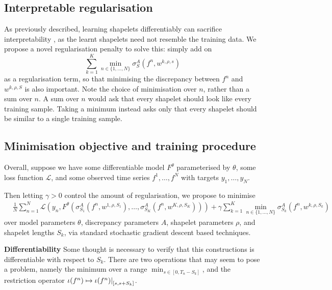 \documentclass{article}
\theoremstyle{plain}
\theoremstyle{definition}
\newcommand{\restr}[2]{{\left.\kern-\nulldelimiterspace #1 \right|_{#2}}}
\newcommand{\boldheading}[1]{

\textbf{#1}\quad}
\begin{document}
	\subsection{Interpretable regularisation}
	As previously described, learning shapelets differentiably can sacrifice interpretability \cite{wang2019interp}, as the learnt shapelets need not resemble the training data. We propose a novel regularisation penalty to solve this: simply add on
	\begin{equation}
		\label{eq:interpretable_reg}
		\sum_{k = 1}^K \min_{n \in \{1, \ldots, N\}} \sigma^A_S(f^n, w^{k, \rho, s})
	\end{equation}
	as a regularisation term, so that minimising the discrepancy between $f^n$ and $w^{k, \rho, S}$ is also important. Note the choice of minimisation over $n$, rather than a sum over $n$. A sum over $n$ would ask that every shapelet should look like every training sample. Taking a minimum instead asks only that every shapelet should be similar to a single training sample.
	
	\subsection{Minimisation objective and training procedure}
	Overall, suppose we have some differentiable model $F^\theta$ parameterised by $\theta$, some loss function $\mathcal{L}$, and some observed time series $f^1, \ldots, f^N$ with targets $y_1, \ldots, y_N$.	
	
	Then letting $\gamma > 0$ control the amount of regularisation, we propose to minimise
	\newcommand{\objective}{&\frac{1}{N}\sum_{n = 1}^N \mathcal{L}(y_n, F^\theta(\sigma^A_{S_1}(f^n, w^{1, \rho, S_1}), \ldots, \sigma^A_{S_K}(f^n, w^{K, \rho, S_K}))) + \gamma \sum_{k = 1}^K \min_{n \in \{1, \ldots, N\}} \sigma^A_{S_k}(f^n, w^{k, \rho, S_k})}
	\begin{align}
	\objective \label{eq:objective}
	\end{align}
	over model parameters $\theta$, discrepancy parameters $A$, shapelet parameters $\rho$, and shapelet lengths $S_k$, via standard stochastic gradient descent based techniques.

	\boldheading{Differentiability}
	Some thought is necessary to verify that this constructions is differentiable with respect to $S_k$. %
	There are two operations that may seem to pose a problem, namely the minimum over a range $\min_{s \in [0, T_n - S_k]}$, and the restriction operator $\iota(f^n) \mapsto \restr{\iota(f^n)}{[s, s + S_k]}$.
\end{document}
